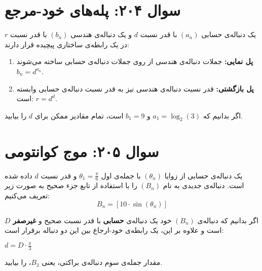 \documentclass[12pt]{article}
\begin{document}
\vspace{1cm}
\hrulefill
\vspace{1cm}

\section*{سوال ۲۰۴: پله‌های خود-مرجع}
یک دنباله‌ی حسابی $(a_n)$ با قدر نسبت $d$ و یک دنباله‌ی هندسی $(b_n)$ با قدر نسبت $r$ در یک رابطه‌ی ساختاری پیچیده قرار دارند:
\vspace{0.5cm}
\begin{enumerate}[label=(\roman*)]
	\item \textbf{پل نمایی:} جملات دنباله‌ی هندسی از روی جملات دنباله‌ی حسابی ساخته می‌شوند\newline $ b_n = d^{a_n} $.
	\item \textbf{پل بازگشتی:} قدر نسبت دنباله‌ی هندسی نیز به قدر نسبت دنباله‌ی حسابی وابسته است: $ r = d^d $.
\end{enumerate}
\vspace{0.5cm}

اگر بدانیم که $a_1 = \log_2(3)$ و $b_1 = 9$ است، تمام مقادیر ممکن برای $d$ را بیابید.

\vspace{1cm}
\hrulefill
\vspace{1cm}

\section*{سوال ۲۰۵: موج کوانتومی}
یک دنباله‌ی حسابی از زوایا $(\theta_n)$ با جمله‌ی اول $\theta_1 = \frac{\pi}{6}$ و قدر نسبت $d$ داده شده است. دنباله‌ی جدیدی به نام $(B_n)$ را با استفاده از تابع جزء صحیح به صورت زیر تعریف می‌کنیم:
\begin{displaymath}
	B_n = [10 \cdot \sin(\theta_n)]
\end{displaymath}
\vspace{0.5cm}

اگر بدانیم که دنباله‌ی $(B_n)$ خود یک دنباله‌ی \textbf{حسابی} با قدر نسبت صحیح و \textbf{غیرصفر} $D$ است و علاوه بر این، یک رابطه‌ی خود-ارجاع بین این دو دنباله برقرار است:
\begin{center}
	$d = D \cdot \frac{\pi}{3}$
\end{center}
\vspace{0.5cm}
مقدار جمله‌ی سوم دنباله‌ی براکتی، یعنی $B_3$، را بیابید.
\end{document}
